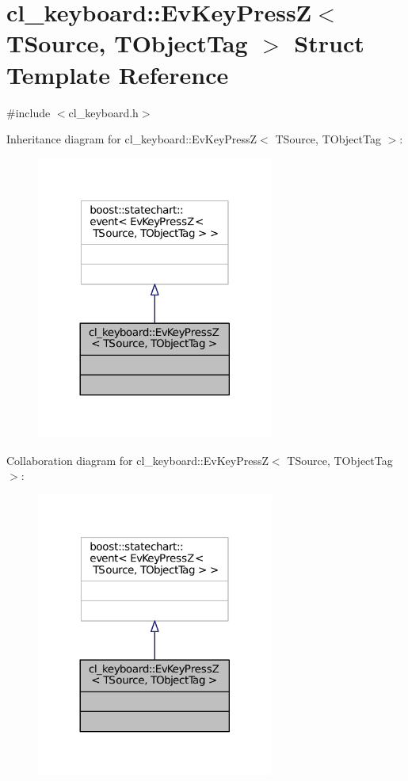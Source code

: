 \hypertarget{structcl__keyboard_1_1EvKeyPressZ}{}\section{cl\+\_\+keyboard\+:\+:Ev\+Key\+PressZ$<$ T\+Source, T\+Object\+Tag $>$ Struct Template Reference}
\label{structcl__keyboard_1_1EvKeyPressZ}


{\ttfamily \#include $<$cl\+\_\+keyboard.\+h$>$}



Inheritance diagram for cl\+\_\+keyboard\+:\+:Ev\+Key\+PressZ$<$ T\+Source, T\+Object\+Tag $>$\+:
\nopagebreak
\begin{figure}[H]
\begin{center}
\leavevmode
\includegraphics[width=221pt]{structcl__keyboard_1_1EvKeyPressZ__inherit__graph}
\end{center}
\end{figure}


Collaboration diagram for cl\+\_\+keyboard\+:\+:Ev\+Key\+PressZ$<$ T\+Source, T\+Object\+Tag $>$\+:
\nopagebreak
\begin{figure}[H]
\begin{center}
\leavevmode
\includegraphics[width=221pt]{structcl__keyboard_1_1EvKeyPressZ__coll__graph}
\end{center}
\end{figure}


